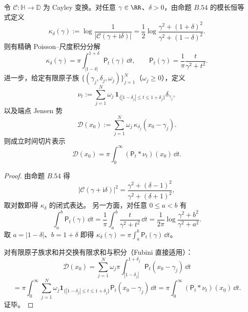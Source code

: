 \begin{conclusion}\label{con:xi-endpoint-singlezero-jensen-poisson-scale-slicing}
令 \(\mathcal C:\mathbb H\to\mathbb D\) 为 Cayley 变换。对任意 \(\gamma\in\RR\)、\(\delta>0\)，由命题 \(B.54\) 的模长恒等式定义
\[
\kappa_\delta(\gamma)
:=\log\frac{1}{|\mathcal C(\gamma+\mathrm{i}\delta)|}
=\frac12\log\frac{\gamma^2+(1+\delta)^2}{\gamma^2+(1-\delta)^2}.
\]
则有精确 Poisson--尺度积分分解
\[
\kappa_\delta(\gamma)
=\pi\int_{|1-\delta|}^{1+\delta}\mathsf P_t(\gamma)\,\dd t,
\qquad
\mathsf P_t(\gamma)=\frac1\pi\frac{t}{\gamma^2+t^2}.
\]
进一步，给定有限原子族 \(\{(\gamma_j,\delta_j,\omega_j)\}_{j=1}^N\)（\(\omega_j\ge0\)），定义
\[
\nu_t:=\sum_{j=1}^N
\omega_j\,
\mathbf 1_{\{|1-\delta_j|\le t\le 1+\delta_j\}}
\delta_{\gamma_j},
\]
以及端点 Jensen 势
\[
\mathcal D(x_0):=\sum_{j=1}^N\omega_j\,\kappa_{\delta_j}(x_0-\gamma_j).
\]
则成立时间切片表示
\[
\mathcal D(x_0)=\pi\int_0^\infty(\mathsf P_t*\nu_t)(x_0)\,\dd t.
\]
\end{conclusion}
\begin{proof}
由命题 \(B.54\) 得
\[
|\mathcal C(\gamma+\mathrm{i}\delta)|^2
=\frac{\gamma^2+(\delta-1)^2}{\gamma^2+(\delta+1)^2},
\]
取对数即得 \(\kappa_\delta\) 的闭式表达。
另一方面，对任意 \(0\le a<b\) 有
\[
\int_a^b\mathsf P_t(\gamma)\,\dd t
=\frac{1}{\pi}\int_a^b\frac{t}{\gamma^2+t^2}\,\dd t
=\frac{1}{2\pi}\log\frac{\gamma^2+b^2}{\gamma^2+a^2}.
\]
取 \(a=|1-\delta|\)、\(b=1+\delta\) 即得
\(
\kappa_\delta(\gamma)=\pi\int_a^b\mathsf P_t(\gamma)\,\dd t
\)。

对有限原子族求和并交换有限求和与积分（Fubini 直接适用）：
\[
\mathcal D(x_0)
=\sum_{j=1}^N\omega_j\pi\int_{|1-\delta_j|}^{1+\delta_j}
\mathsf P_t(x_0-\gamma_j)\,\dd t
\]
\[
=\pi\int_0^\infty
\sum_{j=1}^N\omega_j\mathbf 1_{\{|1-\delta_j|\le t\le 1+\delta_j\}}
\mathsf P_t(x_0-\gamma_j)\,\dd t
=\pi\int_0^\infty(\mathsf P_t*\nu_t)(x_0)\,\dd t.
\]
证毕。
\end{proof}

\endinput

